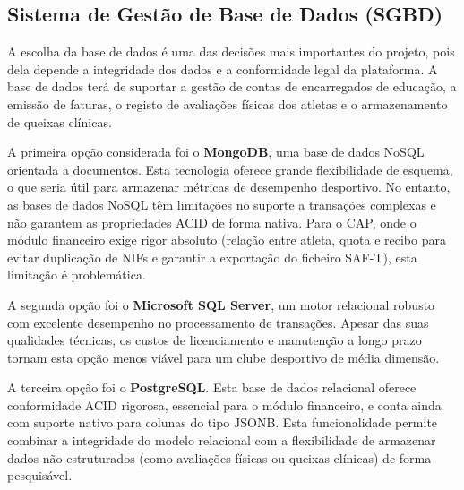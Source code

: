 \documentclass[a4paper,12pt]{scrreprt}
\begin{document}
{\subsection{Sistema de Gestão de Base de Dados (SGBD)}

A escolha da base de dados é uma das decisões mais importantes do projeto, pois dela depende a integridade dos dados e a conformidade legal da plataforma. A base de dados terá de suportar a gestão de contas de encarregados de educação, a emissão de faturas, o registo de avaliações físicas dos atletas e o armazenamento de queixas clínicas.

A primeira opção considerada foi o \textbf{MongoDB}, uma base de dados NoSQL orientada a documentos. Esta tecnologia oferece grande flexibilidade de esquema, o que seria útil para armazenar métricas de desempenho desportivo. No entanto, as bases de dados NoSQL têm limitações no suporte a transações complexas e não garantem as propriedades ACID de forma nativa. Para o CAP, onde o módulo financeiro exige rigor absoluto (relação entre atleta, quota e recibo para evitar duplicação de NIFs e garantir a exportação do ficheiro SAF-T), esta limitação é problemática.

A segunda opção foi o \textbf{Microsoft SQL Server}, um motor relacional robusto com excelente desempenho no processamento de transações. Apesar das suas qualidades técnicas, os custos de licenciamento e manutenção a longo prazo tornam esta opção menos viável para um clube desportivo de média dimensão.

A terceira opção foi o \textbf{PostgreSQL}. Esta base de dados relacional oferece conformidade ACID rigorosa, essencial para o módulo financeiro, e conta ainda com suporte nativo para colunas do tipo JSONB. Esta funcionalidade permite combinar a integridade do modelo relacional com a flexibilidade de armazenar dados não estruturados (como avaliações físicas ou queixas clínicas) de forma pesquisável.

}
\end{document}
